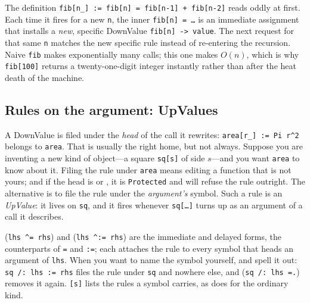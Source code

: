 
The definition \texttt{fib[n\_] := fib[n] = fib[n-1] + fib[n-2]} reads oddly at
first. Each time it fires for a new \texttt{n}, the inner \texttt{fib[n] = \ldots}
is an immediate assignment that installs a \emph{new}, specific DownValue
\texttt{fib[n] -> value}. The next request for that same \texttt{n} matches the
new specific rule instead of re-entering the recursion. Naive \texttt{fib} makes
exponentially many calls; this one makes \(O(n)\), which is why \texttt{fib[100]}
returns a twenty-one-digit integer instantly rather than after the heat death of
the machine.


\subsection{Rules on the argument: UpValues}
\label{ssec:prog-upvalues}

A DownValue is filed under the \emph{head} of the call it rewrites:
\texttt{area[r\_] := Pi r\^{}2} belongs to \texttt{area}. That is usually the right
home, but not always. Suppose you are inventing a new kind of object---a square
\texttt{sq[s]} of side \(s\)---and you want \texttt{area} to know about it. Filing
the rule under \texttt{area} means editing a function that is not yours; and if the
head is  or , it is \texttt{Protected} and will refuse the rule
outright. The alternative is to file the rule under the \emph{argument's} symbol.
Such a rule is an \emph{UpValue}: it lives on \texttt{sq}, and it
fires whenever \texttt{sq[\ldots]} turns up as an argument of a call it describes.

 (\texttt{lhs \^{}= rhs}) and  (\texttt{lhs \^{}:= rhs}) are
the immediate and delayed forms, the counterparts of \texttt{=} and \texttt{:=}; each
attaches the rule to every symbol that heads an argument of \texttt{lhs}. When you
want to name the symbol yourself,  and  spell it out:
\texttt{sq /: lhs := rhs} files the rule under \texttt{sq} and nowhere else, and
 (\texttt{sq /: lhs =.}) removes it again. \texttt{[s]} lists
the rules a symbol carries, as  does for the ordinary kind.


